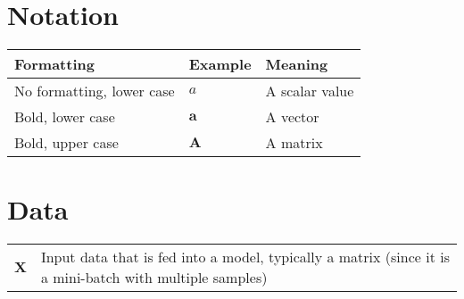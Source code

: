 

\section{Notation}
\begin{tabular}{ | l | l | l | }
	\textbf{Formatting} & \textbf{Example} & \textbf{Meaning}\\
	\hline
  	No formatting, lower case & $a$ & A scalar value\\
  	Bold, lower case & $\boldsymbol{a}$ & A vector\\
  	Bold, upper case & $\boldsymbol{A}$ & A matrix\\
\end{tabular}

\section{Data}


\begin{tabular}{ l l }
  $\boldsymbol{X}$ & Input data that is fed into a model, typically a matrix (since it is a mini-batch with multiple samples)\\
\end{tabular}



